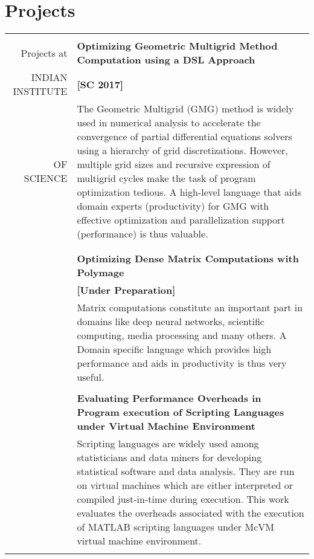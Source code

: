 \documentclass[a4paper,10pt]{article} %
\begin{document}
\section{Projects}
\begin{tabular}{rp{13cm}}
&\\
Projects at & \textbf{Optimizing Geometric Multigrid Method Computation using a DSL Approach} \\
INDIAN INSTITUTE & \hspace{25em} \textbf{[SC 2017]} \\
OF SCIENCE 
& \setlength{\leftskip}{0.4cm}
The Geometric Multigrid (GMG) method is widely used in numerical analysis to accelerate the convergence of partial differential equations solvers using
a hierarchy of grid discretizations. However, multiple grid sizes and recursive 
expression of multigrid cycles make the task of program optimization tedious.
A high-level language that aids domain experts (productivity) for GMG with
effective optimization and parallelization support (performance) is thus valuable.\\
& \\
& \\
& \textbf{Optimizing Dense Matrix Computations with Polymage } \\
& \hspace{25em} \textbf{[Under Preparation]}\\
& \setlength{\leftskip}{0.4cm}
Matrix computations constitute an important part in domains like deep neural networks, scientific computing, media processing and many others. A Domain specific language which provides high performance and aids in productivity is thus very useful.\\
&\\
& \textbf{Evaluating Performance Overheads in Program execution of Scripting Languages under Virtual Machine Environment} \\
& \setlength{\leftskip}{0.4cm}
Scripting languages are widely used among statisticians and data miners for developing statistical software and data analysis. They are run on virtual machines which are either interpreted or compiled just-in-time during execution. This work evaluates the overheads associated with the execution of MATLAB scripting languages under McVM virtual machine environment.\\
& \\

\end{tabular}
\end{document}
